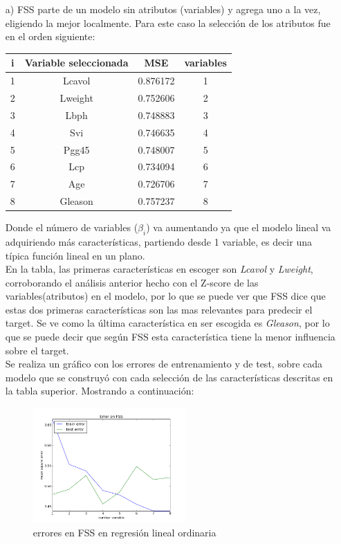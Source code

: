 \documentclass[10pt]{article}
\begin{document}
\begin{itemize}
\item[a)] FSS parte de un modelo sin atributos (variables) y agrega uno a la vez, eligiendo la mejor localmente. Para este caso la selección de los atributos fue en el orden siguiente:

\begin{table}[!htb]
  \begin{center}
    \begin{tabular}{|c|c|c|c|} \hline
    i & Variable seleccionada & MSE & variables \\ \hline
    1 & Lcavol & 0.876172 &1 \\ 
    2 & Lweight & 0.752606 &2 \\ 
    3 & Lbph & 0.748883 &3 \\ 
    4 & Svi & 0.746635 &4 \\ 
    5 & Pgg45 & 0.748007 &5 \\ 
    6 & Lcp & 0.734094 &6 \\ 
    7 & Age & 0.726706 &7 \\
    8 & Gleason & 0.757237 &8 \\ \hline  
    \end{tabular}
  \end{center}
\end{table}

Donde el número de variables ($\beta_i$) va aumentando ya que el modelo lineal va adquiriendo más características, partiendo desde 1 variable, es decir una típica función lineal en un plano.\\
En la tabla, las primeras características en escoger son \textit{Lcavol} y \textit{Lweight}, corroborando el análisis anterior hecho con el Z-score de las variables(atributos) en el modelo, por lo que se puede ver que FSS dice que estas dos primeras características son las mas relevantes para predecir el target. Se ve como la última característica en ser escogida es \textit{Gleason}, por lo que se puede decir que según FSS esta característica tiene la menor influencia sobre el target.\\

Se realiza un gráfico con los errores de entrenamiento y de test, sobre cada modelo que se construyó con cada selección de las características descritas en la tabla superior. Mostrando a continuación:

\begin{figure}[!htb]
    \centering
    \includegraphics[width=0.55\textwidth]{images/fss}
    \caption{errores en FSS en regresión lineal ordinaria}
    \label{fig:mesh1}
\end{figure}


\end{itemize}
\end{document}
